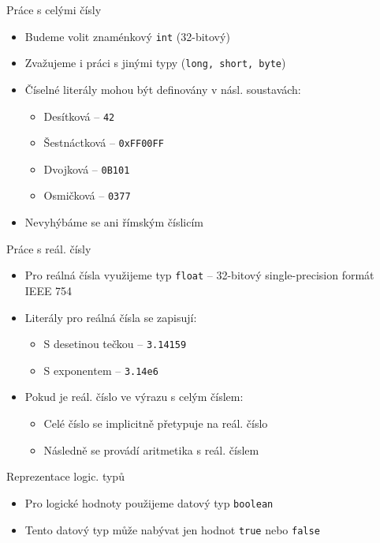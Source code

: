 \documentclass[11pt]{beamer}
\begin{document}
\begin{frame}{Práce s celými čísly}
\begin{itemize}
	\item Budeme volit znaménkový \texttt{int} (32-bitový)
	\item Zvažujeme i práci s jinými typy (\texttt{long, short, byte})
	\item Číselné literály mohou být definovány v násl. soustavách:
	\begin{itemize}
		\item Desítková -- \texttt{42}
		\item Šestnáctková -- \texttt{0xFF00FF}
		\item Dvojková -- \texttt{0B101}
		\item Osmičková -- \texttt{0377}
	\end{itemize}
	\item Nevyhýbáme se ani římským číslicím 
\end{itemize}

\end{frame}
\begin{frame}{Práce s reál. čísly}
\begin{itemize}
	\item Pro reálná čísla využijeme typ \texttt{float} -- 32-bitový single-precision formát IEEE 754
	\item Literály pro reálná čísla se zapisují:
	\begin{itemize}
		\item S desetinou tečkou -- \texttt{3.14159}
		\item S exponentem -- \texttt{3.14e6}
	\end{itemize}	
	\item  Pokud je reál. číslo ve výrazu s celým číslem:
	\begin{itemize}
		\item Celé číslo se implicitně přetypuje na reál. číslo
		\item Následně se provádí aritmetika s reál. číslem
	\end{itemize}
\end{itemize}
\end{frame}
\begin{frame}{Reprezentace logic. typů}
\begin{itemize}
	\item Pro logické hodnoty použijeme datový typ \texttt{boolean}
	\item Tento datový typ může nabývat jen hodnot \texttt{true} nebo \texttt{false}
\end{itemize}
\end{frame}
\end{document}
